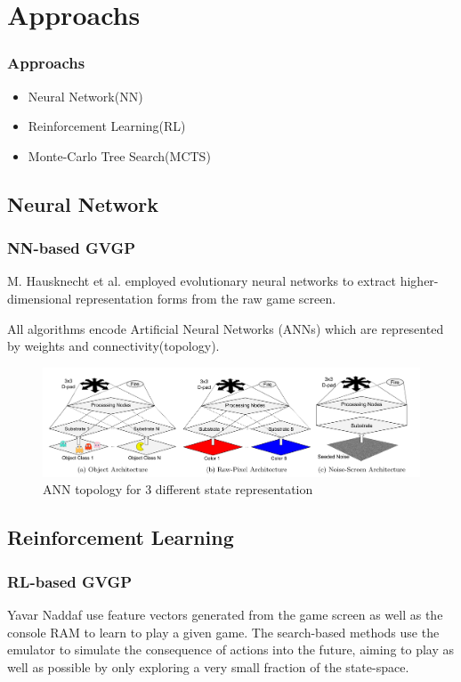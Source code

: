 \documentclass{beamer}
\begin{document}

\section{Approachs}
\begin{frame}
  \frametitle{Approachs}
  \begin{itemize}
    \item Neural Network(NN)
    \item Reinforcement Learning(RL)
    \item Monte-Carlo Tree Search(MCTS)
  \end{itemize}
\end{frame}


\subsection{Neural Network}
\begin{frame}
\frametitle{NN-based GVGP}
M. Hausknecht et al. \cite{5} employed evolutionary neural networks to extract higher-dimensional representation forms from the raw game screen.

All algorithms encode Artificial Neural Networks (ANNs) which are represented by weights and connectivity(topology).
\begin{figure}
  \includegraphics[width=1\linewidth]{figures/m1p1}
  \caption{ANN topology for 3 different state representation}
\end{figure}
\end{frame}

\subsection{Reinforcement Learning}
\begin{frame}
\frametitle{RL-based GVGP}
Yavar Naddaf use feature vectors generated from the game screen as well as the console RAM to learn to play a given game. The search-based methods use the emulator to simulate the consequence of actions into the future, aiming to play as well as possible by only exploring a very small fraction of the state-space.
\end{frame}
\end{document}

